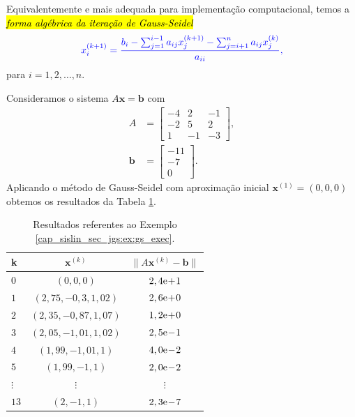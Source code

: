 Equivalentemente e mais adequada para implementação computacional, temos a \hl{\emph{forma algébrica da iteração de Gauss-Seidel}}
\begin{equation}\color{blue}x_i^{(k+1)} = \frac{{b_i - \sum_{j=1}^{i-1} a_{ij}x_j^{(k+1)} - \sum_{j=i+1}^{n} a_{ij}x_j^{(k)}}}{a_{ii}},
\end{equation}
para $i=1, 2, \dotsc, n$.

\begin{ex}\label{cap_sislin_sec_jgs:ex:gs_exec}
  Consideramos o sistema $A\pmb{x} = \pmb{b}$ com
  \begin{align}
    A &=
    \begin{bmatrix}
      -4 & 2 & -1 \\
      -2 & 5 & 2 \\
       1 & -1 & -3
    \end{bmatrix},\\
    \pmb{b} &=
    \begin{bmatrix}
      -11\\ -7\\ 0
    \end{bmatrix}.
  \end{align}
  Aplicando o método de Gauss-Seidel com aproximação inicial $\pmb{x}^{(1)} = (0, 0, 0)$ obtemos os resultados da Tabela \ref{cap_sislin_sec_jgs:tab:ex_gs_exec}.

  \begin{table}[H]
    \centering
    \caption{Resultados referentes ao Exemplo \ref{cap_sislin_sec_jgs:ex:gs_exec}.}
    \begin{tabular}{l|cc}
      k & $\pmb{x}^{(k)}$ & $\|A\pmb{x}^{(k)}-\pmb{b}\|$\\\hline
      $0$ & $(0, 0, 0)$  & $2,4\mathrm{e}\!+\!1$ \\
      $1$ & $(2,75, -0,3, 1,02)$ & $2,6\mathrm{e}\!+\!0$ \\
      $2$ & $(2,35, -0,87, 1,07)$ & $1,2\mathrm{e}\!+\!0$ \\
      $3$ & $(2,05, -1,01, 1,02)$ & $2,5\mathrm{e}\!-\!1$ \\
      $4$ & $(1,99, -1,01, 1)$ & $4,0\mathrm{e}\!-\!2$ \\
      $5$ & $(1,99, -1, 1)$ & $2,0\mathrm{e}\!-\!2$ \\
      $\vdots$ & $\vdots$  & $\vdots$ \\
      $13$ & $(2, -1, 1)$ & $2,3\mathrm{e}\!-\!7$ \\\hline
    \end{tabular}
    \label{cap_sislin_sec_jgs:tab:ex_gs_exec}
  \end{table}


\end{ex}
